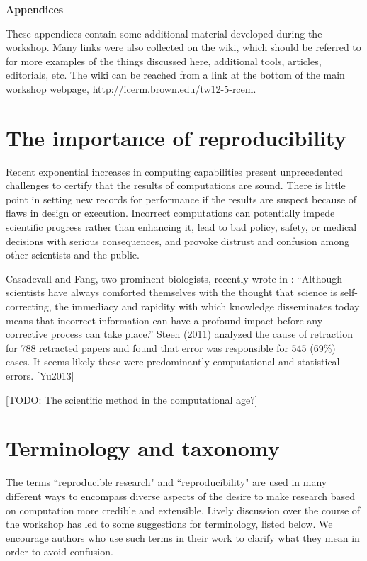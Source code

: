 \documentclass[11pt]{article}
\newcommand{\todo}[1]{{\color{red} [TODO: #1]}}
\newcommand{\todo}[1]{}
\begin{document}



\clearpage
\appendix
\centerline{\Large\bf Appendices}
\vskip 10pt

These appendices contain some additional material developed during the
workshop.  Many links were also collected on the wiki, which should be
referred to for more examples of the things discussed here, additional
tools, articles, editorials, etc.  The wiki can be reached from a link at
the bottom of the main workshop webpage, 
\url{http://icerm.brown.edu/tw12-5-rcem}.

\section{The importance of reproducibility} \label{sec:importance}

Recent exponential increases in computing
capabilities present unprecedented challenges to certify
that the results of computations are sound.  There is little point
in setting new records for performance if the results are suspect
because of flaws in design or execution.  Incorrect computations
can potentially impede scientific progress rather than enhancing
it, lead to bad policy, safety, or medical decisions with serious
consequences, and provoke distrust and confusion among other
scientists and the public.


Casadevall and Fang, two prominent biologists, recently wrote in \cite{??}: 
``Although
scientists have always comforted themselves with the thought that science is
self-correcting, the immediacy and rapidity with which knowledge
disseminates today means that incorrect information can have a profound
impact before any corrective process can take place.'' Steen (2011) analyzed
the cause of retraction for 788 retracted papers and found that error was
responsible for 545 (69\%) cases. It seems likely these were predominantly
computational and statistical errors. [Yu2013]


\todo{The scientific method in the computational age?}

\section{Terminology and taxonomy} \label{sec:taxonomy}

The terms ``reproducible research" and ``reproducibility" are used in many
different ways to encompass diverse aspects of the desire to make research
based on computation more credible and extensible.  Lively discussion over
the course of the workshop has led to some suggestions for terminology,
listed below.  We encourage authors who use such
terms in their work to clarify what they mean in order to avoid confusion. 
\end{document}
